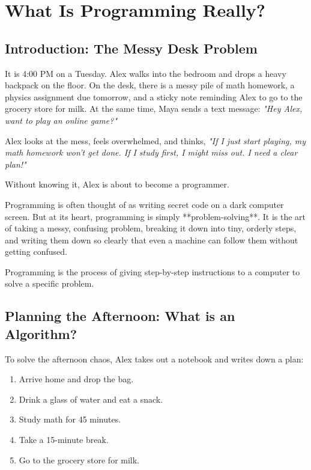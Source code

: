 \chapter{What Is Programming Really?}

\section{Introduction: The Messy Desk Problem}

It is 4:00 PM on a Tuesday. Alex walks into the bedroom and drops a heavy backpack on the floor. On the desk, there is a messy pile of math homework, a physics assignment due tomorrow, and a sticky note reminding Alex to go to the grocery store for milk. At the same time, Maya sends a text message: \textit{"Hey Alex, want to play an online game?"}

Alex looks at the mess, feels overwhelmed, and thinks, \textit{"If I just start playing, my math homework won't get done. If I study first, I might miss out. I need a clear plan!"}

Without knowing it, Alex is about to become a programmer.

Programming is often thought of as writing secret code on a dark computer screen. But at its heart, programming is simply **problem-solving**. It is the art of taking a messy, confusing problem, breaking it down into tiny, orderly steps, and writing them down so clearly that even a machine can follow them without getting confused.

\begin{definition}[Programming]
Programming is the process of giving step-by-step instructions to a computer to solve a specific problem.
\end{definition}

\section{Planning the Afternoon: What is an Algorithm?}

To solve the afternoon chaos, Alex takes out a notebook and writes down a plan:
\begin{enumerate}
    \item Arrive home and drop the bag.
    \item Drink a glass of water and eat a snack.
    \item Study math for 45 minutes.
    \item Take a 15-minute break.
    \item Go to the grocery store for milk.
\end{enumerate}

